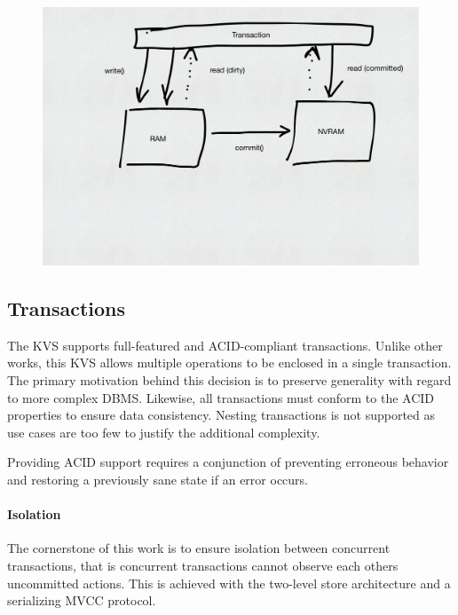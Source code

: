 \begin{figure}[h!]
    \centering
    \includegraphics[width=\textwidth]{figures/drafts/concept-sys-two-level-store.pdf}
    \caption{}
    \label{fig:concept-two-level-store}
\end{figure}


\subsection{Transactions}
\label{ch:concept-kvs-tx}

The \ac{KVS} supports full-featured and ACID-compliant transactions. Unlike
other works, this \ac{KVS} allows multiple operations to be enclosed in a single
transaction. The primary motivation behind this decision is to preserve
generality with regard to more complex \ac{DBMS}. Likewise, all transactions
must conform to the ACID properties to ensure data consistency. Nesting
transactions is not supported as use cases are too few to justify the additional
complexity.

Providing ACID support requires a conjunction of preventing erroneous behavior
and restoring a previously sane state if an error occurs.

\paragraph{Isolation}

The cornerstone of this work is to ensure isolation between concurrent
transactions, that is concurrent transactions cannot observe each others
uncommitted actions. This is achieved with the two-level store architecture and
a serializing \ac{MVCC} protocol.

